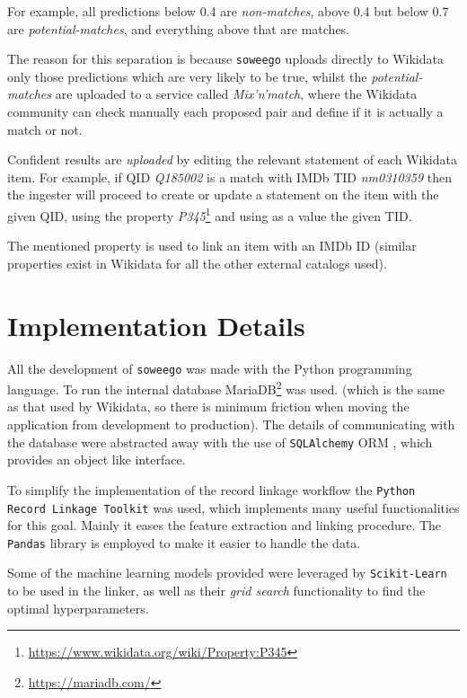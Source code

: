 \documentclass[epsfig,a4paper,11pt,titlepage,twoside,openany]{book}
\newcommand{\footurl}[1]{\footnote{\url{#1}}}
\begin{document}
For example, all predictions below 0.4 are \textit{non-matches}, above 0.4 but below 0.7 are \textit{potential-matches}, and everything above that are matches. 

The reason for this separation is because \texttt{soweego} uploads directly to Wikidata only those predictions which are very likely to be true, whilst the \textit{potential-matches} are uploaded to a service called \textit{Mix'n'match}, where the Wikidata community can check manually each proposed pair and define if it is actually a match or not.

Confident results are \textit{uploaded} by editing the relevant statement of each Wikidata item. For example, if QID \textit{Q185002} is a match with IMDb TID \textit{nm0310359} then the ingester will proceed to create or update a statement on the item with the given QID, using the property \textit{P345}\footurl{https://www.wikidata.org/wiki/Property:P345} and using as a value the given TID. 

The mentioned property is used to link an item with an IMDb ID (similar properties exist in Wikidata for all the other external catalogs used).


\section{Implementation Details}
\label{sec:soweego-implementation-details}

All the development of \texttt{soweego} was made with the Python \cite{python-tutorial} programming language. To run the internal database  MariaDB\footurl{https://mariadb.com/} was used. (which is the same as that used by Wikidata, so there is minimum friction when moving the application from development to production). 
The details of communicating with the database were abstracted away with the use of \texttt{SQLAlchemy} ORM \cite{sqlalchemy}, which provides an object like interface.

To simplify the implementation of the record linkage workflow the \texttt{Python Record Linkage Toolkit} \cite{recordlinkage-library} was used, which implements many useful functionalities for this goal. Mainly it eases the feature extraction and linking procedure. The \texttt{Pandas} \cite{mckinney2010_pandas} library is employed to make it easier to handle the data.

Some of the machine learning models provided were leveraged by \texttt{Scikit-Learn} \cite{scikit-learn} to be used in the linker, as well as their \textit{grid search} functionality to find the optimal hyperparameters.
\end{document}
